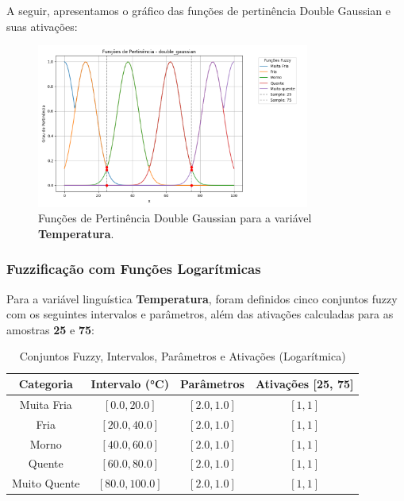 \documentclass[a4paper,12pt]{article}
\begin{document}
A seguir, apresentamos o gráfico das funções de pertinência Double Gaussian e suas ativações:

\begin{figure}[H]
    \centering
    \includegraphics[width=0.8\textwidth]{img/funções_de_pertinência_double_gaussian_fuzzificado.png}
    \caption{Funções de Pertinência Double Gaussian para a variável \textbf{Temperatura}.}
\end{figure}

\subsubsection{Fuzzificação com Funções Logarítmicas}

Para a variável linguística \textbf{Temperatura}, foram definidos cinco conjuntos fuzzy com os seguintes intervalos e parâmetros, além das ativações calculadas para as amostras \textbf{25} e \textbf{75}:

\begin{table}[H]
\centering
\caption{Conjuntos Fuzzy, Intervalos, Parâmetros e Ativações (Logarítmica)}
\begin{tabular}{|c|c|c|c|}
\hline
\textbf{Categoria}    & \textbf{Intervalo (°C)} & \textbf{Parâmetros}       & \textbf{Ativações [25, 75]} \\ \hline
Muita Fria            & $[0.0, 20.0]$          & $[2.0, 1.0]$              & $[1, 1]$                   \\ \hline
Fria                  & $[20.0, 40.0]$         & $[2.0, 1.0]$              & $[1, 1]$                   \\ \hline
Morno                 & $[40.0, 60.0]$         & $[2.0, 1.0]$              & $[1, 1]$                   \\ \hline
Quente                & $[60.0, 80.0]$         & $[2.0, 1.0]$              & $[1, 1]$                   \\ \hline
Muito Quente          & $[80.0, 100.0]$        & $[2.0, 1.0]$              & $[1, 1]$                   \\ \hline
\end{tabular}
\end{table}
\end{document}
